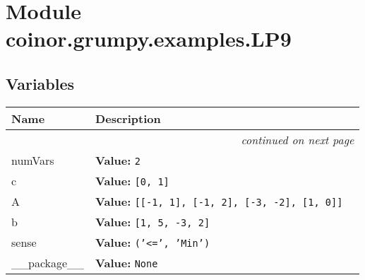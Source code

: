 %
%
%


\section{Module coinor.grumpy.examples.LP9}

    \label{coinor:grumpy:examples:LP9}


  \subsection{Variables}

    \vspace{-1cm}
\hspace{\varindent}\begin{longtable}{|p{\varnamewidth}|p{\vardescrwidth}|l}
\cline{1-2}
\cline{1-2} \centering \textbf{Name} & \centering \textbf{Description}& \\
\cline{1-2}
\endhead\cline{1-2}\multicolumn{3}{r}{\small\textit{continued on next page}}\\\endfoot\cline{1-2}
\endlastfoot\raggedright n\-u\-m\-V\-a\-r\-s\- & \raggedright \textbf{Value:} 
{\tt 2}&\\
\cline{1-2}
\raggedright c\- & \raggedright \textbf{Value:} 
{\tt \texttt{[}0\texttt{, }1\texttt{]}}&\\
\cline{1-2}
\raggedright A\- & \raggedright \textbf{Value:} 
{\tt \texttt{[}\texttt{[}-1\texttt{, }1\texttt{]}\texttt{, }\texttt{[}-1\texttt{, }2\texttt{]}\texttt{, }\texttt{[}-3\texttt{, }-2\texttt{]}\texttt{, }\texttt{[}1\texttt{, }0\texttt{]}\texttt{]}}&\\
\cline{1-2}
\raggedright b\- & \raggedright \textbf{Value:} 
{\tt \texttt{[}1\texttt{, }5\texttt{, }-3\texttt{, }2\texttt{]}}&\\
\cline{1-2}
\raggedright s\-e\-n\-s\-e\- & \raggedright \textbf{Value:} 
{\tt \texttt{(}\texttt{'}\texttt{{\textless}=}\texttt{'}\texttt{, }\texttt{'}\texttt{Min}\texttt{'}\texttt{)}}&\\
\cline{1-2}
\raggedright \_\-\_\-p\-a\-c\-k\-a\-g\-e\-\_\-\_\- & \raggedright \textbf{Value:} 
{\tt None}&\\
\cline{1-2}
\end{longtable}


